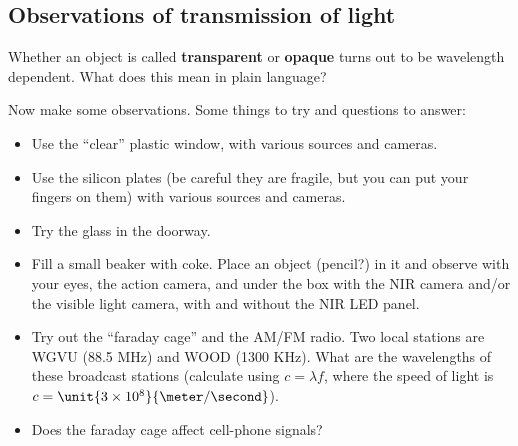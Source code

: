 \subsection{Observations of transmission of light}

Whether an object is called {\bf transparent} or {\bf opaque} turns out to be wavelength dependent.  What does this mean in plain language?

\vspace{5cm}

\noindent Now make some observations.  Some things to try and questions to answer:
	\begin{itemize}
	\item Use the ``clear'' plastic window, with various sources and cameras.
	\item Use the silicon plates (be careful they are fragile, but you can put your fingers on them) with various sources and cameras.
	\item Try the glass in the doorway.
	\item Fill a small beaker with coke. Place an object (pencil?) in it and observe with your eyes, the action camera, and under the box with the NIR camera and/or the visible light camera, with and without the NIR LED panel.
	\item Try out the ``faraday cage'' and the AM/FM radio.  Two local stations are WGVU (88.5 MHz) and WOOD (1300 KHz).  What are the wavelengths of these broadcast stations (calculate using $c = \lambda f$, where the speed of light is $c = \unit{3 \times 10^8}{\meter/\second}$).
	\item Does the faraday cage affect cell-phone signals?
	\end{itemize}






 